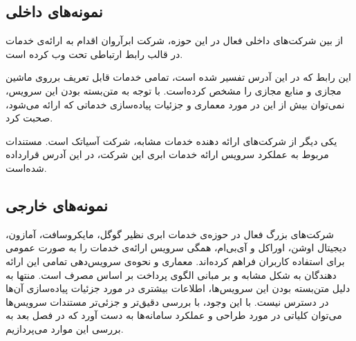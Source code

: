 \subsection{نمونه‌های داخلی}
از بین شرکت‌های داخلی فعال در این حوزه، شرکت ابرآروان اقدام به ارائه‌ی خدمات  در قالب رابط ارتباطی تحت وب کرده است.

این رابط که در این آدرس\cite{arvancloud} تفسیر شده است، تمامی خدمات قابل تعریف برروی ماشین مجازی و منابع مجازی را مشخص کرده‌است. با توجه به متن‌بسته بودن این سرویس، نمی‌توان بیش از این در مورد معماری و جزئیات پیاده‌سازی خدماتی که ارائه می‌شود، صحبت کرد.


یکی دیگر از شرکت‌های ارائه دهنده خدمات مشابه، شرکت آسیاتک است. مستندات مربوط به عملکرد سرویس ارائه خدمات ابری این شرکت، در این آدرس\cite{asiatech} قرارداده شده‌است.


\subsection{نمونه‌های خارجی}
شرکت‌های بزرگ فعال در حوزه‌ی خدمات ابری نظیر گوگل، مایکروسافت، آمازون، دیجیتال اوشن، اوراکل و آی‌بی‌ام، همگی سرویس ارائه‌ی خدمات  را به صورت عمومی برای استفاده کاربران فراهم کرده‌اند. معماری و نحوه‌ی سرویس‌دهی تمامی این ارائه دهندگان به شکل مشابه و بر مبانی الگوی پرداخت بر اساس مصرف است. منتها به دلیل متن‌بسته بودن این سرویس‌ها، اطلاعات بیشتری در مورد جزئیات پیاده‌سازی آن‌ها در دسترس نیست. با این وجود، با بررسی دقیق‌تر و جزئی‌تر مستندات سرویس‌ها می‌توان کلیاتی در مورد طراحی و عملکرد سامانه‌ها به دست آورد که در فصل بعد به بررسی این موارد می‌پردازیم.